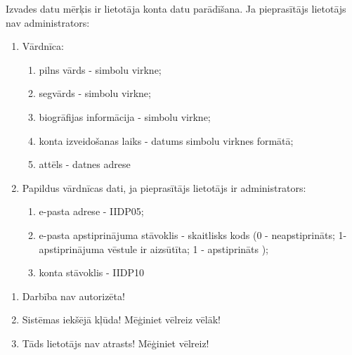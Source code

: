 {
	Izvades datu mērķis ir lietotāja konta datu parādīšana.
	Ja pieprasītājs lietotājs nav administrators:
	\begin{enumerate}
		\item Vārdnīca:
		      \begin{enumerate}
			      \item pilns vārds - simbolu virkne;
			      \item segvārds - simbolu virkne;
			      \item biogrāfijas informācija - simbolu virkne;
			      \item konta izveidošanas laiks - datums simbolu virknes formātā;
			      \item attēls - datnes adrese
		      \end{enumerate}
		\item Papildus vārdnīcas dati, ja pieprasītājs lietotājs ir administrators:
		      \begin{enumerate}
			      \item e-pasta adrese - IIDP05;
			      \item e-pasta apstiprinājuma stāvoklis - skaitlisks kods (0 - neapstiprināts; 1- apstiprinājuma vēstule ir aizsūtīta; 1 - apstiprināts );
			      \item konta stāvoklis - IIDP10
		      \end{enumerate}
	\end{enumerate}
}
{
	\begin{enumerate}
		\item Darbība nav autorizēta!
		\item Sistēmas iekšējā kļūda! Mēģiniet vēlreiz vēlāk!
		\item Tāds lietotājs nav atrasts! Mēģiniet vēlreiz!
	\end{enumerate}
}
